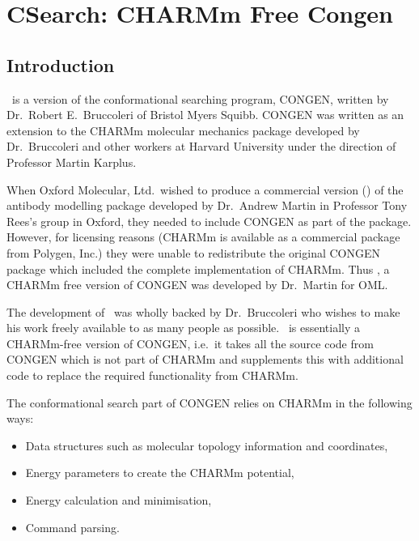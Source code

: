 \chapter{CSearch: CHARMm Free Congen}

\section{Introduction}
\cs\ is a version of the conformational searching program, CONGEN, 
written by Dr.\ Robert E.\ Bruccoleri of Bristol Myers 
Squibb\cite{bruc:congen}.
CONGEN was written as an extension to the CHARMm molecular mechanics
package\cite{brooks:charmm} developed by Dr.\ Bruccoleri and other 
workers at Harvard
University under the direction of Professor Martin Karplus.

When Oxford Molecular, Ltd.\ wished to produce a commercial version (\abm)
of the antibody modelling package\cite{martin:loops,martin:thesis}
developed by Dr.\ Andrew Martin
in Professor Tony Rees's group in Oxford, they needed to include
CONGEN as part of the package. However, for licensing reasons
(CHARMm is available as a commercial package from Polygen, Inc.)
they were unable to redistribute the original CONGEN package which
included the complete implementation of CHARMm. Thus \cs, a CHARMm
free version of CONGEN was developed by Dr.\ Martin for OML.

The development of \cs\ was wholly backed by Dr.\ Bruccoleri who
wishes to make his work freely available to as many people as
possible. \cs\ is essentially a CHARMm-free version of CONGEN,
i.e.\ it takes all the source code from CONGEN which is not
part of CHARMm and supplements this with additional code to replace
the required functionality from CHARMm.

The conformational search part of CONGEN relies on CHARMm in the
following ways:
\begin{itemize}
\item Data structures such as molecular topology information and
coordinates,
\item Energy parameters to create the CHARMm potential,
\item Energy calculation and minimisation,
\item Command parsing.
\end{itemize}

